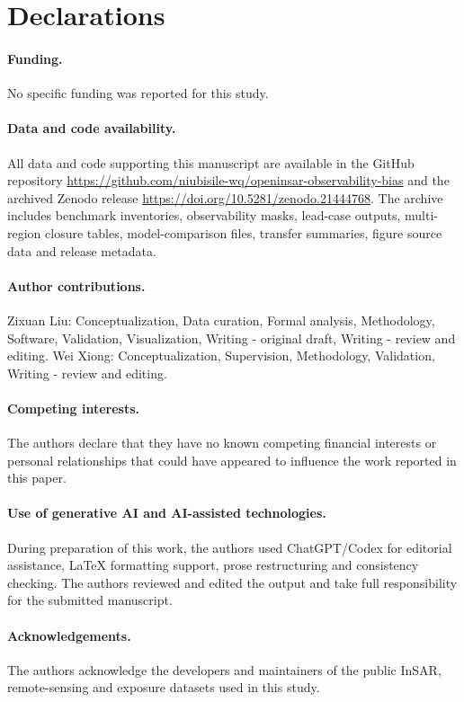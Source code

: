 \documentclass[pdflatex,sn-mathphys-ay]{sn-jnl}
\begin{document}
\backmatter
\section*{Declarations}

\paragraph{Funding.} No specific funding was reported for this study.

\paragraph{Data and code availability.} All data and code supporting this manuscript are available in the GitHub repository \url{https://github.com/niubisile-wq/openinsar-observability-bias} and the archived Zenodo release \url{https://doi.org/10.5281/zenodo.21444768}. The archive includes benchmark inventories, observability masks, lead-case outputs, multi-region closure tables, model-comparison files, transfer summaries, figure source data and release metadata.

\paragraph{Author contributions.} Zixuan Liu: Conceptualization, Data curation, Formal analysis, Methodology, Software, Validation, Visualization, Writing - original draft, Writing - review and editing. Wei Xiong: Conceptualization, Supervision, Methodology, Validation, Writing - review and editing.

\paragraph{Competing interests.} The authors declare that they have no known competing financial interests or personal relationships that could have appeared to influence the work reported in this paper.

\paragraph{Use of generative AI and AI-assisted technologies.} During preparation of this work, the authors used ChatGPT/Codex for editorial assistance, LaTeX formatting support, prose restructuring and consistency checking. The authors reviewed and edited the output and take full responsibility for the submitted manuscript.

\paragraph{Acknowledgements.} The authors acknowledge the developers and maintainers of the public InSAR, remote-sensing and exposure datasets used in this study.


\end{document}
